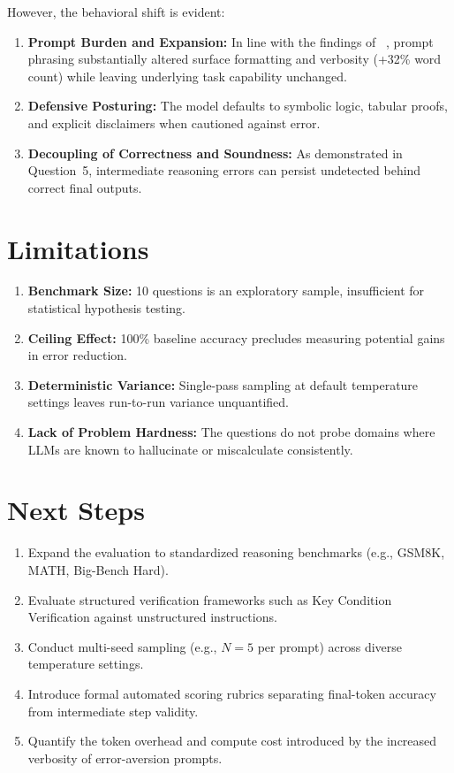 \documentclass[11pt,a4paper]{article}
\begin{document}
However, the behavioral shift is evident:
\begin{enumerate}[leftmargin=*]
    \item \textbf{Prompt Burden and Expansion:} In line with the findings of \citeauthor{hua2025}~\cite{hua2025}, prompt phrasing substantially altered surface formatting and verbosity (+32\% word count) while leaving underlying task capability unchanged.
    \item \textbf{Defensive Posturing:} The model defaults to symbolic logic, tabular proofs, and explicit disclaimers when cautioned against error.
    \item \textbf{Decoupling of Correctness and Soundness:} As demonstrated in Question~5, intermediate reasoning errors can persist undetected behind correct final outputs.
\end{enumerate}

\section{Limitations}

\begin{enumerate}[leftmargin=*]
    \item \textbf{Benchmark Size:} 10 questions is an exploratory sample, insufficient for statistical hypothesis testing.
    \item \textbf{Ceiling Effect:} 100\% baseline accuracy precludes measuring potential gains in error reduction.
    \item \textbf{Deterministic Variance:} Single-pass sampling at default temperature settings leaves run-to-run variance unquantified.
    \item \textbf{Lack of Problem Hardness:} The questions do not probe domains where LLMs are known to hallucinate or miscalculate consistently.
\end{enumerate}

\section{Next Steps}

\begin{enumerate}[leftmargin=*]
    \item Expand the evaluation to standardized reasoning benchmarks (e.g., GSM8K, MATH, Big-Bench Hard).
    \item Evaluate structured verification frameworks such as Key Condition Verification \cite{wu2024} against unstructured instructions.
    \item Conduct multi-seed sampling (e.g., $N=5$ per prompt) across diverse temperature settings.
    \item Introduce formal automated scoring rubrics separating final-token accuracy from intermediate step validity.
    \item Quantify the token overhead and compute cost introduced by the increased verbosity of error-aversion prompts.
\end{enumerate}
\end{document}
